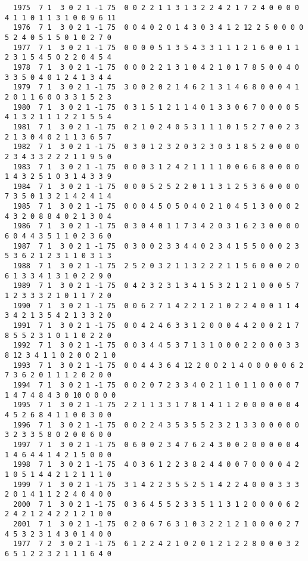 \begin{landscape}
{\begin{verbatim}
  1975  7 1  3 0 2 1 -1 75  0 0 2 2 1 1 3 1 3 2 2 4 2 1 7 2 4 0 0 0 0 4 1 1 0 1 1 3 1 0 0 9 6 11
  1976  7 1  3 0 2 1 -1 75  0 0 4 0 2 0 1 4 3 0 3 4 1 2 12 2 5 0 0 0 0 5 2 4 0 5 1 5 0 1 0 2 7 0
  1977  7 1  3 0 2 1 -1 75  0 0 0 0 5 1 3 5 4 3 3 1 1 1 2 1 6 0 0 1 1 2 3 1 5 4 5 0 2 2 0 4 5 4
  1978  7 1  3 0 2 1 -1 75  0 0 0 2 2 1 3 1 0 4 2 1 0 1 7 8 5 0 0 4 0 3 3 5 0 4 0 1 2 4 1 3 4 4
  1979  7 1  3 0 2 1 -1 75  3 0 0 2 0 2 1 4 6 2 1 3 1 4 6 8 0 0 0 4 1 2 0 1 1 6 0 0 3 3 1 5 2 3
  1980  7 1  3 0 2 1 -1 75  0 3 1 5 1 2 1 1 4 0 1 3 3 0 6 7 0 0 0 0 5 4 1 3 2 1 1 1 2 2 1 5 5 4
  1981  7 1  3 0 2 1 -1 75  0 2 1 0 2 4 0 5 3 1 1 1 0 1 5 2 7 0 0 2 3 2 1 3 0 4 0 2 1 1 3 6 5 7
  1982  7 1  3 0 2 1 -1 75  0 3 0 1 2 3 2 0 3 2 3 0 3 1 8 5 2 0 0 0 0 2 3 4 3 3 2 2 2 1 1 9 5 0
  1983  7 1  3 0 2 1 -1 75  0 0 0 3 1 2 4 2 1 1 1 1 0 0 6 6 8 0 0 0 0 1 4 3 2 5 1 0 3 1 4 3 3 9
  1984  7 1  3 0 2 1 -1 75  0 0 0 5 2 5 2 2 0 1 1 3 1 2 5 3 6 0 0 0 0 7 3 5 0 1 3 2 1 4 2 4 1 4
  1985  7 1  3 0 2 1 -1 75  0 0 0 4 5 0 5 0 4 0 2 1 0 4 5 1 3 0 0 0 2 4 3 2 0 8 8 4 0 2 1 3 0 4
  1986  7 1  3 0 2 1 -1 75  0 3 0 4 0 1 1 7 3 4 2 0 3 1 6 2 3 0 0 0 0 6 0 4 4 3 5 1 1 0 2 3 6 0
  1987  7 1  3 0 2 1 -1 75  0 3 0 0 2 3 3 4 4 0 2 3 4 1 5 5 0 0 0 2 3 5 3 6 2 1 2 3 1 1 0 3 1 3
  1988  7 1  3 0 2 1 -1 75  2 5 2 0 3 2 1 1 3 2 2 2 1 1 5 6 0 0 0 2 0 6 1 3 3 4 1 3 1 0 2 2 9 0
  1989  7 1  3 0 2 1 -1 75  0 4 2 3 2 3 1 3 4 1 5 3 2 1 2 1 0 0 0 5 7 1 2 3 3 3 2 1 0 1 1 7 2 0
  1990  7 1  3 0 2 1 -1 75  0 0 6 2 7 1 4 2 2 1 2 1 0 2 2 4 0 0 1 1 4 3 4 2 1 3 5 4 2 1 3 3 2 0
  1991  7 1  3 0 2 1 -1 75  0 0 4 2 4 6 3 3 1 2 0 0 0 4 4 2 0 0 2 1 7 8 5 5 2 3 1 0 1 1 0 2 2 0
  1992  7 1  3 0 2 1 -1 75  0 0 3 4 4 5 3 7 1 3 1 0 0 0 2 2 0 0 0 3 3 8 12 3 4 1 1 0 2 0 0 2 1 0
  1993  7 1  3 0 2 1 -1 75  0 0 4 4 3 6 4 12 2 0 0 2 1 4 0 0 0 0 0 6 2 7 3 6 2 0 1 1 1 2 0 2 0 0
  1994  7 1  3 0 2 1 -1 75  0 0 2 0 7 2 3 3 4 0 2 1 1 0 1 1 0 0 0 0 7 1 4 7 4 8 4 3 0 10 0 0 0 0
  1995  7 1  3 0 2 1 -1 75  2 2 1 1 3 3 1 7 8 1 4 1 1 2 0 0 0 0 0 0 4 4 5 2 6 8 4 1 1 0 0 3 0 0
  1996  7 1  3 0 2 1 -1 75  0 0 2 2 4 3 5 3 5 5 2 3 2 1 3 3 0 0 0 0 0 3 2 3 3 5 8 0 2 0 0 6 0 0
  1997  7 1  3 0 2 1 -1 75  0 6 0 0 2 3 4 7 6 2 4 3 0 0 2 0 0 0 0 0 4 1 4 6 4 4 1 4 2 1 5 0 0 0
  1998  7 1  3 0 2 1 -1 75  4 0 3 6 1 2 2 3 8 2 4 4 0 0 7 0 0 0 0 4 2 1 0 5 1 4 4 2 1 2 1 1 1 0
  1999  7 1  3 0 2 1 -1 75  3 1 4 2 2 3 5 5 2 5 1 4 2 2 4 0 0 0 3 3 3 2 0 1 4 1 1 2 2 4 0 4 0 0
  2000  7 1  3 0 2 1 -1 75  0 3 6 4 5 5 2 3 3 5 1 1 3 1 2 0 0 0 0 6 2 2 4 2 1 2 4 2 2 1 2 1 0 0
  2001  7 1  3 0 2 1 -1 75  0 2 0 6 7 6 3 1 0 3 2 2 1 2 1 0 0 0 0 2 7 4 5 3 2 3 1 4 3 0 1 4 0 0
  1977  7 2  3 0 2 1 -1 75  6 1 2 2 4 2 1 0 2 0 1 2 1 2 2 8 0 0 0 3 2 6 5 1 2 2 3 2 1 1 1 6 4 0

\end{verbatim}}
\end{landscape}
